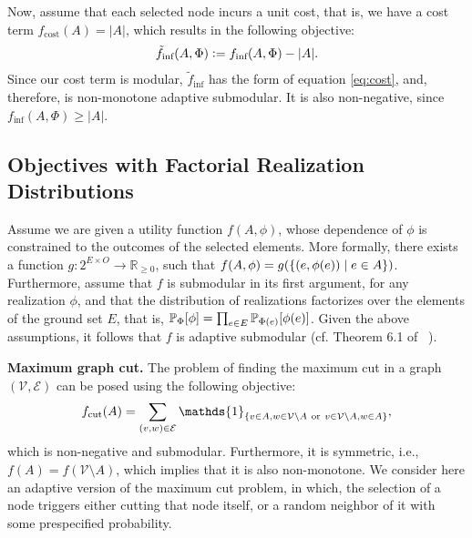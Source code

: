 \documentclass{article}
\newcommand{\defeq}{\vcentcolon=}
\let\originalleft\left
\let\originalright\right
\renewcommand{\left}{\mathopen{}\mathclose\bgroup\originalleft}
\renewcommand{\right}{\aftergroup\egroup\originalright}
\newcommand{\citet}[1]{\citeauthor{#1}~\shortcite{#1}}
\renewcommand{\paragraph}[1]{\vspace{0.3em}\noindent\textbf{#1.}\makebox[0.5em]{}}
\begin{document}
Now, assume that each selected node incurs a unit cost, that is, we have a cost term $f_{\textrm{cost}}(A) = |A|$, which results in the following objective:
\begin{align*}
  \tilde{f}_{\textrm{inf}}(A, \Phi) \defeq f_{\textrm{inf}}(A, \Phi) - |A|.
\end{align*}
Since our cost term is modular, $\tilde{f}_{\textrm{inf}}$ has the form of equation \eqref{eq:cost}, and, therefore, is non-monotone adaptive submodular.
It is also non-negative, since $f_{\textrm{inf}}(A, \Phi) \geq |A|$.

\subsection{Objectives with Factorial Realization Distributions}
Assume we are given a utility function $f(A, \phi)$, whose dependence of $\phi$ is constrained to the outcomes of the selected elements.
More formally, there exists a function $g : 2^{E \times O} \to \mathbb{R}_{\geq 0}$, such that $f(A, \phi) = g\left(\{(e, \phi(e)) \mid e \in A\}\right)$.
Furthermore, assume that $f$ is submodular in its first argument, for any realization $\phi$, and that the distribution of realizations factorizes over the elements of the ground set $E$, that is, $\P[\Phi]{\phi} = \prod_{e \in E}\P[\Phi(e)]{\phi(e)}$.
Given the above assumptions, it follows that $f$ is adaptive submodular (cf. Theorem 6.1 of \citet{golovin11}).

\paragraph{Maximum graph cut}
The problem of finding the maximum cut in a graph $(\mathcal{V}, \mathcal{E})$ can be posed using the following objective:
\begin{align*}
  f_{\textrm{cut}}(A) = \sum_{(v, w) \in \mathcal{E}} \mathds{1}_{\left\{v \in A, w \in \mathcal{V}\setminus A\ \textrm{or}\ v \in \mathcal{V}\setminus A, w \in A\right\}},
\end{align*}
which is non-negative and submodular.
Furthermore, it is symmetric, i.e., $f(A) = f(\mathcal{V}\setminus A)$, which implies that it is also non-monotone.
We consider here an adaptive version of the maximum cut problem, in which, the selection of a node triggers either cutting that node itself, or a random neighbor of it with some prespecified probability.
\end{document}
